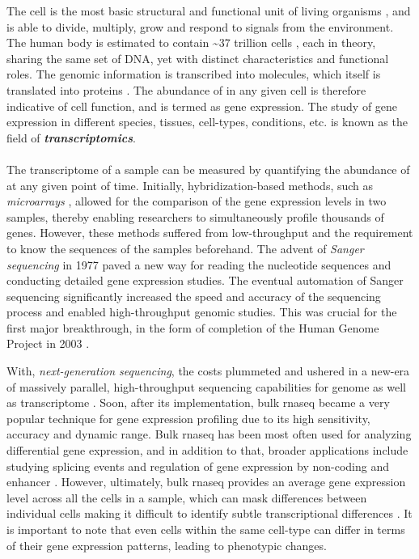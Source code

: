 The cell is the most basic structural and functional unit of living organisms \textbf{\cite{regev_human_nodate}}, and is able to divide, multiply, grow and respond to signals from the environment. The human body is estimated to contain \textasciitilde37 trillion cells \textbf{\cite{wen_recent_2022}}, each in theory, sharing the same set of DNA, yet with distinct characteristics and functional roles. The genomic information is transcribed into  molecules, which itself is translated into proteins \textbf{\cite{costa_uncovering_2010}}. The abundance of  in any given cell is therefore indicative of cell function, and is termed as gene expression. The study of gene expression in different species, tissues, cell-types, conditions, etc. is known as the field of \textit{\textbf{transcriptomics}}.\\\\
The transcriptome of a sample can be measured by quantifying the abundance of  at any given point of time. Initially, hybridization-based methods, such as \textit{microarrays} \textbf{\cite{lockhart_expression_1996,schena_quantitative_1995}}, allowed for the comparison of the gene expression levels in two samples, thereby enabling researchers to simultaneously profile thousands of genes. However, these methods suffered from low-throughput and the requirement to know the sequences of the  samples beforehand. The advent of \textit{Sanger sequencing} in 1977 \textbf{\cite{sanger_dna_1977}} paved a new way for reading the nucleotide sequences and conducting detailed gene expression studies. The eventual automation of Sanger sequencing significantly increased the speed and accuracy of the sequencing process and enabled high-throughput genomic studies. This was crucial for the first major breakthrough, in the form of completion of the Human Genome Project in 2003 \textbf{\cite{collins_human_2003}}.\\
\par With, \textit{next-generation sequencing}, the costs plummeted and ushered in a new-era of massively parallel, high-throughput sequencing capabilities for genome as well as transcriptome \textbf{\cite{voelkerding_next-generation_2009}}. Soon, after its implementation, bulk \gls{rnaseq} became a very popular technique for gene expression profiling due to its high sensitivity, accuracy and dynamic range. Bulk \gls{rnaseq} has been most often used for analyzing differential gene expression, and in addition to that, broader applications include studying splicing events and regulation of gene expression by non-coding and enhancer  \textbf{\cite{stark_rna_2019}}. However, ultimately, bulk \gls{rnaseq} provides an average gene expression level across all the cells in a sample, which can mask differences between individual cells making it difficult to identify subtle transcriptional differences \textbf{\cite{kalisky_brief_2018}}. It is important to note that even cells within the same cell-type can differ in terms of their gene expression patterns, leading to phenotypic changes. %
